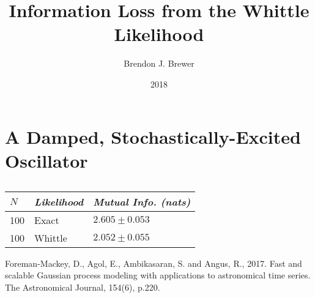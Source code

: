 \documentclass[a4paper, 12pt]{article}
\title{Information Loss from the Whittle Likelihood}
\author{Brendon J. Brewer}
\date{2018}
\begin{document}
\maketitle


\setlength{\parindent}{0pt}
\setlength{\parskip}{1em}

\section{A Damped, Stochastically-Excited Oscillator}

\begin{table}[!ht]
\centering
\begin{tabular}{|lll|}
\hline
$N$         &       {\em Likelihood}      &  {\em Mutual Info. (nats)} \\
\hline
100         &       Exact           & $2.605 \pm 0.053$ \\
100         &       Whittle         & $2.052 \pm 0.055$ \\
\hline
\end{tabular}
\caption{\label{tab:oscillator_results}}
\end{table}


\begin{thebibliography}{999}
Foreman-Mackey, D., Agol, E., Ambikasaran, S. and Angus, R., 2017. Fast and scalable Gaussian process modeling with applications to astronomical time series. The Astronomical Journal, 154(6), p.220.
\end{thebibliography}
\end{document}
